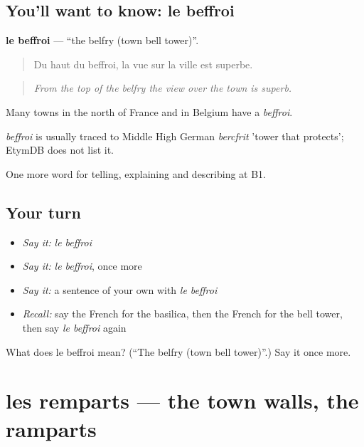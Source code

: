 \subsection*{You'll want to know: le beffroi}
\textbf{le beffroi} — \textquotedblleft{}the belfry (town bell tower)\textquotedblright{}.

\begin{quote}
Du haut du beffroi, la vue sur la ville est superbe.
\end{quote}

\begin{quote}
\emph{From the top of the belfry the view over the town is superb.}
\end{quote}

Many towns in the north of France and in Belgium have a \emph{beffroi}.

\begin{cousinweb}
\emph{beffroi} is usually traced to Middle High German \emph{bercfrit} 'tower that protects'; EtymDB does not list it.
\end{cousinweb}

\begin{grammarlens}[title={What you've built}]
One more word for telling, explaining and describing at B1.
\end{grammarlens}

\subsection*{Your turn}
\begin{itemize}
\raggedright
  \item \emph{Say it:} \emph{le beffroi}
  \item \emph{Say it:} \emph{le beffroi}, once more
  \item \emph{Say it:} a sentence of your own with \emph{le beffroi}
  \item \emph{Recall:} say the French for the basilica, then the French for the bell tower, then say \emph{le beffroi} again
\end{itemize}

\begin{tcolorbox}[breakable,colback=teal!4,colframe=teal!35!black,title={Before you move on}]
What does le beffroi mean? (\textquotedblleft{}The belfry (town bell tower)\textquotedblright{}.) Say it once more.
\end{tcolorbox}
\section[les remparts]{les remparts — the town walls, the ramparts}

